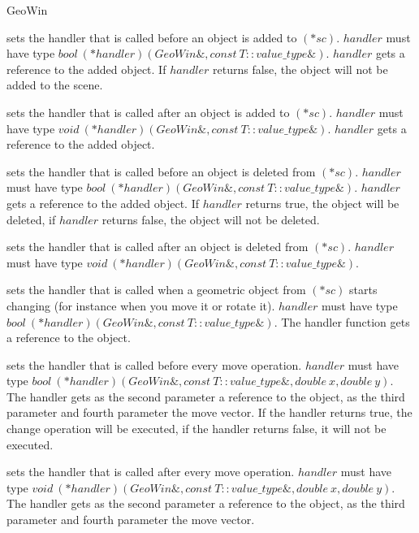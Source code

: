 \begin{ccRefClass}{GeoWin}
\begin{ccAdvanced}
{sets the handler that is called before an object is added to $(*sc)$.
$handler$ must have type $bool\ (*handler)(GeoWin\&, const\ T::value\_type \&)$.
$handler$ gets a reference to the added object. If $handler$ returns false, 
the object will not be added to the scene.}
  
{sets the handler that is called after an object is added to $(*sc)$. 
$handler$ must have type $void\ (*handler)(GeoWin\&, const\ T::value\_type \&)$.
$handler$ gets a reference to the added object.
}

{sets the handler that is called before an object is  deleted from $(*sc)$.
$handler$ must have type $bool\ (*handler)(GeoWin\&, const\ T::value\_type \&)$.
$handler$ gets a reference to the added object. If $handler$ returns true, the object
will be deleted, if $handler$ returns false, the object will not be deleted.}
  
{sets the handler that is called after an object is deleted from $(*sc)$.
$handler$ must have type $void\ (*handler)(GeoWin\&, const\ T::value\_type \&)$.
}

{sets the handler that is called when a geometric object from $(*sc)$ starts changing 
(for instance when you move it or rotate it).
$handler$ must have type $bool\ (*handler)(GeoWin\&, const\ T::value\_type \&)$.
The handler function gets a reference to the object.
}

\clearpage
{}
{sets the handler that is called before every move operation.
$handler$ must have type $bool\ (*handler)(GeoWin\&, const\ T::value\_type \&, double\ x, double\ y)$. 
The handler gets as the second parameter a reference to the object, as the third parameter
and fourth parameter the move vector.
If the handler returns true, the change operation will be executed, if the handler
returns false, it will not be executed. 
}
  
{sets the handler that is called after every move operation.
$handler$ must have type $void\ (*handler)(GeoWin\&, const\ T::value\_type \&, double\ x, double\ y)$. 
The handler gets as the second parameter a reference to the object, as the third parameter
and fourth parameter the move vector.  
}
 

\end{ccAdvanced}
\end{ccRefClass}
